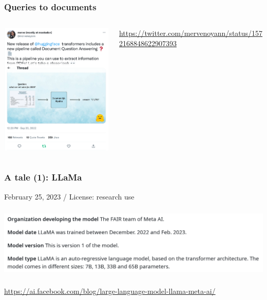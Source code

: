 \documentclass[17pt,aspectratio=169,hyperref={pdfusetitle,colorlinks,allcolors=olive}]{beamer}
\begin{document}
\begin{frame}[fragile]
  \frametitle{Queries to documents}

  \begin{columns}[T]
    \begin{column}{.58\textwidth}
      \includegraphics[width=7.5cm]{figs/pdf-extract}
    \end{column}%
    \hfill%
    \begin{column}{.38\textwidth}
      \vspace{1.5cm}
    {\scriptsize
      \url{https://twitter.com/mervenoyann/status/1572168848622907393}
    }
    \end{column}%
  \end{columns}

\end{frame}

\begin{frame}[fragile]
  \frametitle{A tale (1): LLaMa}

  February 25, 2023 / License: research use

  \includegraphics[height=3.5cm]{figs/llama}
  
  \begin{flushright}
    {\scriptsize
      \url{https://ai.facebook.com/blog/large-language-model-llama-meta-ai/}
    }
  \end{flushright}

\end{frame}
\end{document}
